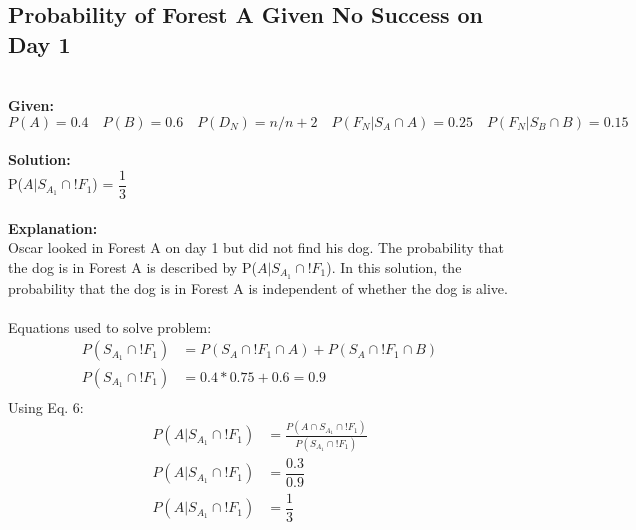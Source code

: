 \subsection{Probability of Forest A Given No Success on Day 1}
 \\
{\bf Given:}\\    
    $ P(A) = 0.4 \quad P(B) = 0.6 \quad P(D_N) = n/n+2 \quad P(F_{N}|S_A \cap A) = 0.25 \quad P(F_{N}|S_B \cap B) = 0.15 $\\ \\
{\bf Solution:}\\
    {\color{blue}P($A|S_{A_1} \cap !F_1$) = $\dfrac{1}{3}$}\\ \\
{\bf Explanation:}\\
    Oscar looked in Forest A on day 1 but did not find his dog. The probability that the dog is in Forest A is described by P($A|S_{A_1} \cap !F_1$). In this solution, the probability that the dog is in Forest A is independent of whether the dog is alive. \\\\
    Equations used to solve problem: \\
    \begin{equation}\label{eq6}
        \begin{split}
            P(S_{A_1}\cap !F_1) &= P(S_A \cap !F_1 \cap A) + P(S_A \cap !F_1 \cap B) \\
        P(S_{A_1}\cap !F_1) &= 0.4*0.75 + 0.6 = 0.9 \\
        \end{split}
    \end{equation}
    Using Eq. 6:
    \begin{align*}
        P(A|S_{A_1} \cap !F_1) &= \frac{P(A \cap S_{A_1} \cap !F_1)}{P(S_{A_1}\cap !F_1)}  \\
        P(A|S_{A_1} \cap !F_1) &= \dfrac{0.3}{0.9} \\
        P(A|S_{A_1} \cap !F_1) &= \dfrac{1}{3} \\
    \end{align*}
\pagebreak